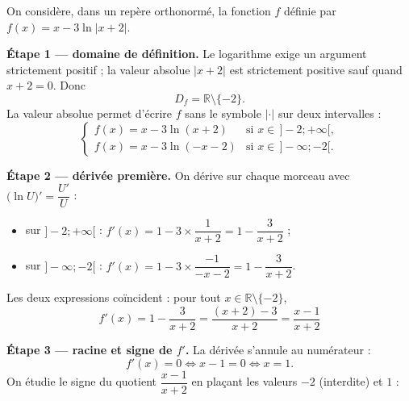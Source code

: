 \documentclass[11pt,a4paper]{article}
\newcommand{\R}{\mathbb{R}}
\begin{document}
\begin{exemple}[Étude complète de $f(x)=x-3\ln|x+2|$]
On considère, dans un repère orthonormé, la fonction $f$ définie par $f(x)=x-3\ln|x+2|$.

\medskip
\textbf{Étape 1 — domaine de définition.} Le logarithme exige un argument strictement positif ; la
valeur absolue $|x+2|$ est strictement positive sauf quand $x+2=0$. Donc
\[
   D_f=\R\setminus\{-2\}.
\]
La valeur absolue permet d'écrire $f$ sans le symbole $|\cdot|$ sur deux intervalles :
\[
   \begin{cases}
     f(x)=x-3\ln(x+2) & \text{si } x\in\,]-2;+\infty[,\\[2pt]
     f(x)=x-3\ln(-x-2) & \text{si } x\in\,]-\infty;-2[.
   \end{cases}
\]

\textbf{Étape 2 — dérivée première.} On dérive sur chaque morceau avec $\big(\ln U\big)'=\dfrac{U'}{U}$ :
\begin{itemize}[leftmargin=1.6em,topsep=2pt,itemsep=2pt]
  \item sur $]-2;+\infty[$ : $f'(x)=1-3\times\dfrac{1}{x+2}=1-\dfrac{3}{x+2}$ ;
  \item sur $]-\infty;-2[$ : $f'(x)=1-3\times\dfrac{-1}{-x-2}=1-\dfrac{3}{x+2}$.
\end{itemize}
Les deux expressions co\"incident : pour tout $x\in\R\setminus\{-2\}$,
\[
   \boxed{\;f'(x)=1-\frac{3}{x+2}=\frac{(x+2)-3}{x+2}=\frac{x-1}{x+2}\;}
\]

\textbf{Étape 3 — racine et signe de $f'$.} La dérivée s'annule au numérateur :
\[
   f'(x)=0 \Longleftrightarrow x-1=0 \Longleftrightarrow x=1.
\]
On étudie le signe du quotient $\dfrac{x-1}{x+2}$ en plaçant les valeurs $-2$ (interdite) et $1$ :


\end{exemple}
\end{document}
